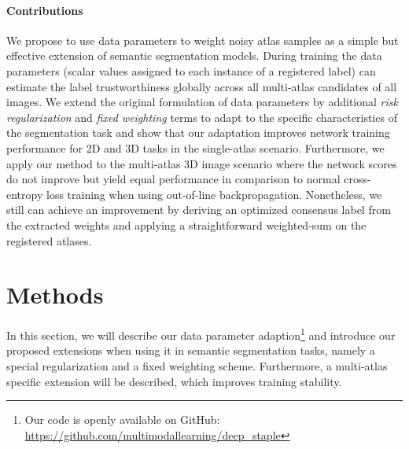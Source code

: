 \paragraph{\textbf{Contributions}}
\label{sec:contributions}
We propose to use data parameters \citep{saxena2019data} to weight noisy atlas samples as a simple but effective extension of semantic segmentation models. During training the data parameters (scalar values assigned to each instance of a registered label) can estimate the label trustworthiness globally across all multi-atlas candidates of all images.
We extend the original formulation of data parameters by additional \emph{risk regularization} and \emph{fixed weighting} terms to adapt to the specific characteristics of the segmentation task and show that our adaptation improves network training performance for 2D and 3D tasks in the single-atlas scenario.
Furthermore, we apply our method to the multi-atlas 3D image scenario where the network scores do not improve but yield equal performance in comparison to normal cross-entropy loss training when using {out-of-line backpropagation}.
Nonetheless, we still can achieve an improvement by deriving an optimized consensus label from the extracted weights and applying a straightforward weighted-sum on the registered atlases.

\section{Methods}
\label{sec:method_deepstaple}
    In this section, we will describe our data parameter adaption\footnote{Our code is openly available on GitHub: \url{https://github.com/multimodallearning/deep_staple}} and introduce our proposed extensions when using it in semantic segmentation tasks, namely a special regularization and a fixed weighting scheme. Furthermore, a multi-atlas specific extension will be described, which improves training stability.
